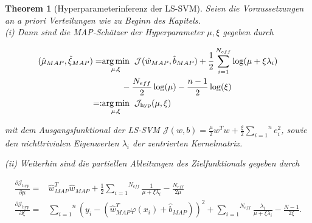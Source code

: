 \documentclass{report}
\theoremstyle{linebreak}
\newtheorem{theorem}[defi]{Theorem}
\begin{document}
\begin{theorem}[Hyperparameterinferenz der LS-SVM]

Seien die Voraussetzungen an a priori Verteilungen wie zu Beginn des Kapitels.\\
(i) Dann sind die MAP-Schätzer der Hyperparameter $\mu, \xi$ gegeben durch

\begin{align*}
	(\hat{\mu}_{MAP}, \hat{\xi}_{MAP}) =& \underset{\mu, \xi}{\arg \min}  \hspace{0.2cm}		\mathcal{J}(\hat{w}_{MAP}, \hat{b}_{MAP}) + \frac{1}{2}\sum_{i=1}^{N_{eff}}\log(\mu 		+ \xi \lambda_i) \\
	 & \hspace{0.8cm}- \frac{N_{eff}}{2}\log(\mu) - \frac{n -1 }{2}\log(\xi)\\
	=:& \underset{\mu, \xi}{\arg \min} \hspace{0.2cm}	\mathcal{J}_\text{hyp}(\mu, \xi)
\end{align*}



mit dem Ausgangsfunktional der LS-SVM 
$\mathcal{J}(w,b) = \frac{\mu}{2}w^T w + \frac{\xi}{2}\overset{n}{\underset{i=1}{\sum}} e_i ^2$,
sowie den nichttrivialen Eigenwerten $\lambda_i$ der zentrierten Kernelmatrix.

(ii) Weiterhin sind die partiellen Ableitungen des Zielfunktionals gegeben durch

\begin{align*}
	\frac{\partial \mathcal{J}_\text{hyp}}{\partial \mu} = & \hat{w}_{MAP}^T \hat{w}			_{MAP} + \frac{1}{2} \overset{N_{eff}}{\underset{i=1}{\sum}} \frac{1}{\mu + \xi 			\lambda_i} - \frac{N_{eff}}{2\mu} \\
    \frac{\partial \mathcal{J}_\text{hyp}}{\partial \xi} = & \overset{n}						{\underset{i=1}{\sum}}( y_i - (\hat{w}_{MAP}^T \varphi(x_i) + \hat{b}_{MAP}))^2 + \overset{N_{eff}}{\underset{i=1}{\sum}} \frac{\lambda_i}{\mu + \xi \lambda_i} - \frac{N-1}{2\xi}.
\end{align*} 
\end{theorem}
\end{document}

